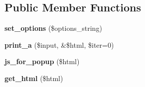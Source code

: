 \subsection*{Public Member Functions}
\begin{DoxyCompactItemize}
\item 
\mbox{\label{class_dbug_l_a519f2c0532394498c7f363731960f4de}} 
{\bfseries set\+\_\+options} (\$options\+\_\+string)
\item 
\mbox{\label{class_dbug_l_a5ef54a81e7a97043bd7b964a31e5ecf5}} 
{\bfseries print\+\_\+a} (\$input, \&\$html, \$iter=0)
\item 
\mbox{\label{class_dbug_l_ab2156df9e320e1a85d9ce6cdedb687cd}} 
{\bfseries js\+\_\+for\+\_\+popup} (\$html)
\item 
\mbox{\label{class_dbug_l_a264917dc38c1b88283ca308cb607a98a}} 
{\bfseries get\+\_\+html} (\$html)
\end{DoxyCompactItemize}
